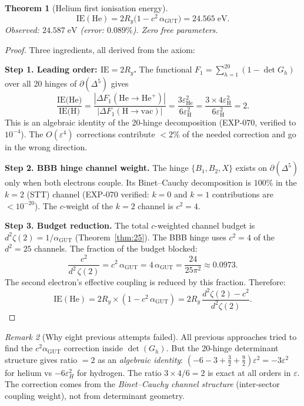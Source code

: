 \documentclass[12pt]{article}
\newtheorem{theorem}{Theorem}[section]
\theoremstyle{remark}
\newtheorem{remark}[theorem]{Remark}
\theoremstyle{definition}
\begin{document}
\begin{theorem}[Helium first ionisation energy]
\label{thm:helium_IE}
\begin{equation}
\boxed{\text{IE}(\text{He}) = 2R_y\bigl(1 - c^2\,\alpha_\text{GUT}\bigr) = 24.565\;\text{eV}.}
\end{equation}
Observed: $24.587\;\text{eV}$ (error: $0.089\%$).  Zero free parameters.
\end{theorem}
\begin{proof}
Three ingredients, all derived from the axiom:

\textbf{Step 1.  Leading order: $\mathrm{IE} = 2R_y$.}
The functional $F_1 = \sum_{h=1}^{20}(1-\det G_h)$ over all 20 hinges of $\partial(\Delta^5)$ gives
\begin{equation}
\frac{\text{IE(He)}}{\text{IE(H)}} = \frac{|\Delta F_1(\text{He}\to\text{He}^+)|}{|\Delta F_1(\text{H}\to\text{vac})|}
= \frac{3\varepsilon_\text{He}^2}{6\varepsilon_\text{H}^2} = \frac{3 \times 4\varepsilon_\text{H}^2}{6\varepsilon_\text{H}^2} = 2.
\end{equation}
This is an algebraic identity of the 20-hinge decomposition (EXP-070, verified to $10^{-4}$).  The $O(\varepsilon^4)$ corrections contribute $<2\%$ of the needed correction and go in the wrong direction.

\textbf{Step 2.  BBB hinge channel weight.}
The hinge $\{B_1, B_2, X\}$ exists on $\partial(\Delta^5)$ only when both electrons couple.  Its Binet--Cauchy decomposition is $100\%$ in the $k=2$ (STT) channel (EXP-070 verified: $k=0$ and $k=1$ contributions are $< 10^{-20}$).  The $c$-weight of the $k=2$ channel is $c^2 = 4$.

\textbf{Step 3.  Budget reduction.}
The total $c$-weighted channel budget is $d^2\zeta(2) = 1/\alpha_\text{GUT}$ (Theorem~\ref{thm:25}).
The BBB hinge uses $c^2 = 4$ of the $d^2 = 25$ channels.  The fraction of the budget blocked:
\begin{equation}
\frac{c^2}{d^2\,\zeta(2)} = c^2\,\alpha_\text{GUT} = 4\,\alpha_\text{GUT} = \frac{24}{25\pi^2} \approx 0.0973.
\end{equation}
The second electron's effective coupling is reduced by this fraction.  Therefore:
\begin{equation}
\text{IE}(\text{He}) = 2R_y \times \left(1 - c^2\,\alpha_\text{GUT}\right) = 2R_y\,\frac{d^2\zeta(2) - c^2}{d^2\zeta(2)}.
\end{equation}
\end{proof}

\begin{remark}[Why eight previous attempts failed]
All previous approaches tried to find the $c^2\alpha_\text{GUT}$ correction inside $\det(G_h)$.  But the 20-hinge determinant structure gives ratio $= 2$ as an \emph{algebraic identity}: $(-6 - 3 + \tfrac{3}{2} + \tfrac{9}{2})\varepsilon^2 = -3\varepsilon^2$ for helium vs $-6\varepsilon_H^2$ for hydrogen.  The ratio $3 \times 4 / 6 = 2$ is exact at all orders in $\varepsilon$.  The correction comes from the \emph{Binet--Cauchy channel structure} (inter-sector coupling weight), not from determinant geometry.
\end{remark}
\end{document}
